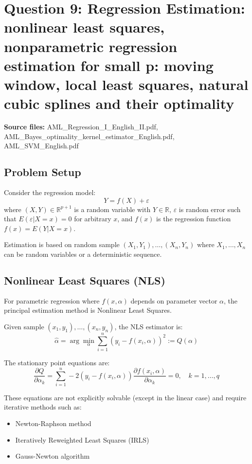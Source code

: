 \documentclass[12pt,a4paper]{article}
\begin{document}
\newpage
\section{Question 9: Regression Estimation: nonlinear least squares, nonparametric regression estimation for small p: moving window, local least squares, natural cubic splines and their optimality}

\textbf{Source files:} AML\_Regression\_I\_English\_II.pdf, AML\_Bayes\_optimality\_kernel\_estimator\_English.pdf, AML\_SVM\_English.pdf

\subsection{Problem Setup}

Consider the regression model:
\begin{equation}
Y = f(X) + \varepsilon
\end{equation}
where $(X,Y) \in \mathbb{R}^{p+1}$ is a random variable with $Y \in \mathbb{R}$, $\varepsilon$ is random error such that $E(\varepsilon|X = x) = 0$ for arbitrary $x$, and $f(x)$ is the regression function $f(x) = E(Y|X = x)$.

Estimation is based on random sample $(X_1, Y_1), \ldots, (X_n, Y_n)$ where $X_1, \ldots, X_n$ can be random variables or a deterministic sequence.

\subsection{Nonlinear Least Squares (NLS)}

For parametric regression where $f(x,\alpha)$ depends on parameter vector $\alpha$, the principal estimation method is Nonlinear Least Squares.

Given sample $(x_1, y_1), \ldots, (x_n, y_n)$, the NLS estimator is:
\begin{equation}
\hat{\alpha} = \arg\min_{\alpha} \sum_{i=1}^n (y_i - f(x_i, \alpha))^2 := Q(\alpha)
\end{equation}

The stationary point equations are:
\begin{equation}
\frac{\partial Q}{\partial \alpha_k} = \sum_{i=1}^n -2(y_i - f(x_i, \alpha))\frac{\partial f(x_i, \alpha)}{\partial \alpha_k} = 0, \quad k = 1, \ldots, q
\end{equation}

These equations are not explicitly solvable (except in the linear case) and require iterative methods such as:
\begin{itemize}
    \item Newton-Raphson method
    \item Iteratively Reweighted Least Squares (IRLS)
    \item Gauss-Newton algorithm
\end{itemize}
\end{document}
